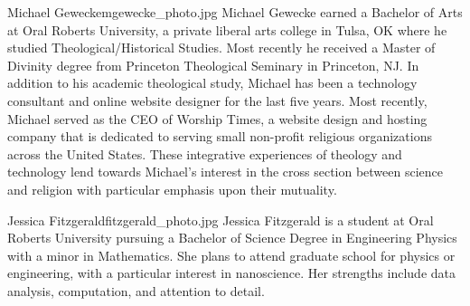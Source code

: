 \begin{authorbio}{Michael Gewecke}{mgewecke_photo.jpg}{}
Michael Gewecke earned a Bachelor of Arts at Oral Roberts University, a private liberal arts college in Tulsa, OK where he studied Theological/Historical Studies.  Most recently he received a Master of Divinity degree from Princeton Theological Seminary in Princeton, NJ.  In addition to his academic theological study, Michael has been a technology consultant and online website designer for the last five years.  Most recently, Michael served as the CEO of Worship Times, a website design and hosting company that is dedicated to serving small non-profit religious organizations across the United States.  These integrative experiences of theology and technology lend towards Michael's interest in the cross section between science and religion with particular emphasis upon their mutuality.   
\end{authorbio}

\begin{authorbio}{Jessica Fitzgerald}{fitzgerald_photo.jpg}{}
Jessica Fitzgerald is a student at Oral Roberts University pursuing a Bachelor of Science Degree in Engineering Physics with a minor in Mathematics. She plans to attend graduate school for physics or engineering, with a particular interest in nanoscience. Her strengths include data analysis, computation, and attention to detail.
\end{authorbio}

~

